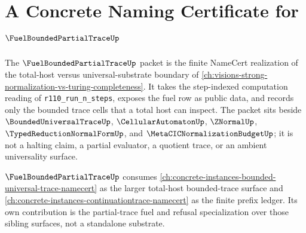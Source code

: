 \chapter{A Concrete Naming Certificate for $\FuelBoundedPartialTraceUp$}
\label{ch:concrete-instances-fuelboundedpartialtrace-namecert}

The $\FuelBoundedPartialTraceUp$ packet is the finite NameCert realization of the total-host versus universal-substrate boundary of \autoref{ch:visions-strong-normalization-vs-turing-completeness}. It takes the step-indexed computation reading of \texttt{r110\_run\_n\_steps}, exposes the fuel row as public data, and records only the bounded trace cells that a total host can inspect. The packet sits beside $\BoundedUniversalTraceUp$, $\CellularAutomatonUp$, $\ZNormalUp$, $\TypedReductionNormalFormUp$, and $\MetaCICNormalizationBudgetUp$; it is not a halting claim, a partial evaluator, a quotient trace, or an ambient universality surface.



$\FuelBoundedPartialTraceUp$ consumes \autoref{ch:concrete-instances-bounded-universal-trace-namecert} as the larger total-host bounded-trace surface and \autoref{ch:concrete-instances-continuationtrace-namecert} as the finite prefix ledger. Its own contribution is the partial-trace fuel and refusal specialization over those sibling surfaces, not a standalone substrate.

